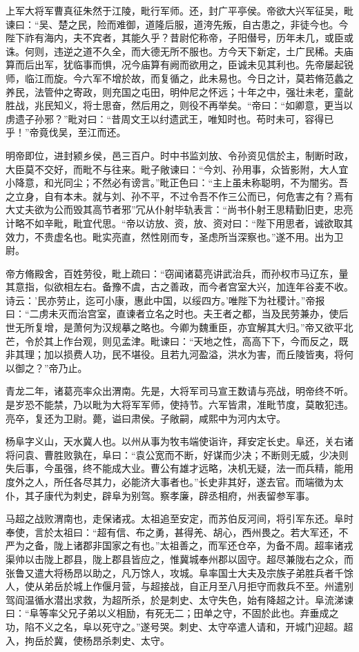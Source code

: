 \documentclass[12pt,UTF8]{ctexbook}
\begin{document}
上军大将军曹真征朱然于江陵，毗行军师。还，封广平亭侯。帝欲大兴军征吴，毗谏曰：“吴、楚之民，险而难御，道隆后服，道洿先叛，自古患之，非徒今也。今陛下祚有海内，夫不宾者，其能久乎？昔尉佗称帝，子阳僣号，历年未几，或臣或诛。何则，违逆之道不久全，而大德无所不服也。方今天下新定，土广民稀。夫庙算而后出军，犹临事而惧，况今庙算有阙而欲用之，臣诚未见其利也。先帝屡起锐师，临江而旋。今六军不增於故，而复循之，此未易也。今日之计，莫若脩范蠡之养民，法管仲之寄政，则充国之屯田，明仲尼之怀远；十年之中，强壮未老，童龀胜战，兆民知义，将士思奋，然后用之，则役不再举矣。“帝曰：“如卿意，更当以虏遗子孙邪？”毗对曰：“昔周文王以纣遗武王，唯知时也。苟时未可，容得已乎！”帝竟伐吴，至江而还。

明帝即位，进封颍乡侯，邑三百户。时中书监刘放、令孙资见信於主，制断时政，大臣莫不交好，而毗不与往来。毗子敞谏曰：“今刘、孙用事，众皆影附，大人宜小降意，和光同尘；不然必有谤言。”毗正色曰：“主上虽未称聪明，不为闇劣。吾之立身，自有本未。就与刘、孙不平，不过令吾不作三公而已，何危害之有？焉有大丈夫欲为公而毁其高节者邪”冗从仆射毕轨表言：“尚书仆射王思精勤旧吏，忠亮计略不如辛毗，毗宜代思。“帝以访放、资，放、资对曰：“陛下用思者，诚欲取其效力，不贵虚名也。毗实亮直，然性刚而专，圣虑所当深察也。”遂不用。出为卫尉。

帝方脩殿舍，百姓劳役，毗上疏曰：“窃闻诸葛亮讲武治兵，而孙权巿马辽东，量其意指，似欲相左右。备豫不虞，古之善政，而今者宫室大兴，加连年谷麦不收。诗云：'民亦劳止，迄可小康，惠此中国，以绥四方。'唯陛下为社稷计。”帝报曰：“二虏未灭而治宫室，直谏者立名之时也。夫王者之都，当及民劳兼办，使后世无所复增，是萧何为汉规摹之略也。今卿为魏重臣，亦宜解其大归。”帝又欲平北芒，令於其上作台观，则见孟津。毗谏曰：“天地之性，高高下下，今而反之，既非其理；加以损费人功，民不堪役。且若九河盈溢，洪水为害，而丘陵皆夷，将何以御之？”帝乃止。

青龙二年，诸葛亮率众出渭南。先是，大将军司马宣王数请与亮战，明帝终不听。是岁恐不能禁，乃以毗为大将军军师，使持节。六军皆肃，准毗节度，莫敢犯违。亮卒，复还为卫尉。薨，谥曰肃侯。子敞嗣，咸熙中为河内太守。

杨阜字义山，天水冀人也。以州从事为牧韦端使诣许，拜安定长史。阜还，关右诸将问袁、曹胜败孰在，阜曰：“袁公宽而不断，好谋而少决；不断则无威，少决则失后事，今虽强，终不能成大业。曹公有雄才远略，决机无疑，法一而兵精，能用度外之人，所任各尽其力，必能济大事者也。”长史非其好，遂去官。而端徵为太仆，其子康代为刺史，辟阜为别驾。察孝廉，辟丞相府，州表留参军事。

马超之战败渭南也，走保诸戎。太祖追至安定，而苏伯反河间，将引军东还。阜时奉使，言於太祖曰：“超有信、布之勇，甚得羌、胡心，西州畏之。若大军还，不严为之备，陇上诸郡非国家之有也。”太祖善之，而军还仓卒，为备不周。超率诸戎渠帅以击陇上郡县，陇上郡县皆应之，惟冀城奉州郡以固守。超尽兼陇右之众，而张鲁又遣大将杨昂以助之，凡万馀人，攻城。阜率国士大夫及宗族子弟胜兵者千馀人，使从弟岳於城上作偃月营，与超接战，自正月至八月拒守而救兵不至。州遣别驾阎温循水潜出求救，为超所杀，於是刺史、太守失色，始有降超之计。阜流涕谏曰：“阜等率父兄子弟以义相励，有死无二；田单之守，不固於此也。弃垂成之功，陷不义之名，阜以死守之。”遂号哭。刺史、太守卒遣人请和，开城门迎超。超入，拘岳於冀，使杨昂杀刺史、太守。
\end{document}
